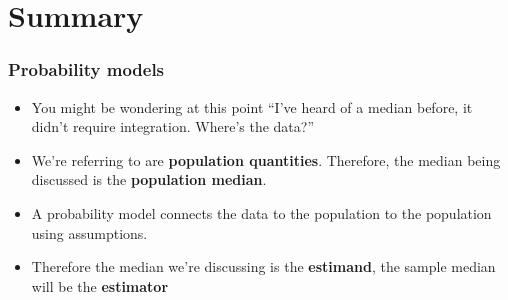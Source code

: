 \documentclass[aspectratio=169]{beamer}
\begin{document}
\section{Summary}
\begin{frame}
\frametitle{Probability models}
\begin{itemize}
\item You might be wondering at this point ``I've heard of a median before, it didn't require integration. Where's the data?''
\item We're referring to are {\bf population quantities}. Therefore, the median being
	discussed is the {\bf population median}.
\item A probability model connects the data to the population to the population using assumptions.
\item Therefore the median we're discussing is the {\bf estimand}, the sample median will be the {\bf estimator}
\end{itemize}
\end{frame}
\end{document}

